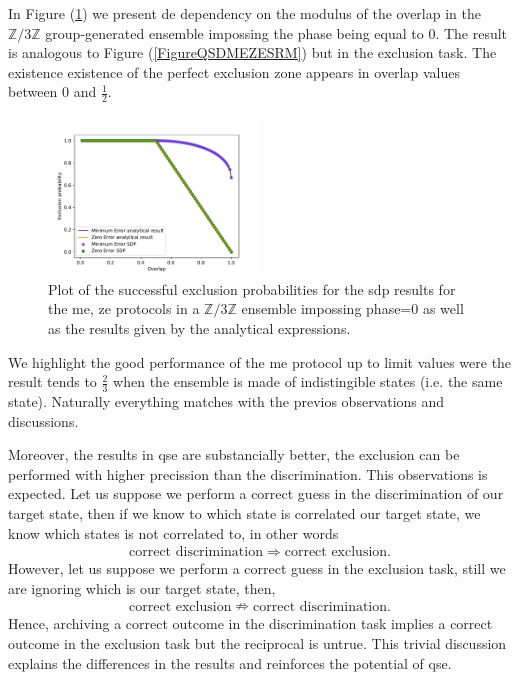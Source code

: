 \documentclass[12pt,letterpaper]{article}
\begin{document}
\begin{multicols}{2}
In Figure (\ref{FigureQSEMEZESRM}) we present de dependency on the modulus of the overlap in the $\mathbb{Z}/3\mathbb{Z}$ group-generated ensemble impossing the phase being equal to 0. The result is analogous to Figure (\ref{FigureQSDMEZESRM}) but in the exclusion task. The existence existence of the perfect exclusion zone appears in overlap values between 0 and $\frac{1}{2}$. 

\begin{figure}[H]
	\centering
	\includegraphics[width=0.5\textwidth]{../Plots/ExclusionOverlapVSSucessProbabilitySDPvsSRMZnOverlap3Phase0.pdf}
	\caption{Plot of the successful exclusion probabilities for the \gls{sdp} results for the \gls{me}, \gls{ze} protocols in a $\mathbb{Z}/3\mathbb{Z}$ ensemble impossing phase=$0$ as well as the results given by the analytical expressions.}
	\label{FigureQSEMEZESRM}
\end{figure}

We highlight the good performance of the \gls{me} protocol up to limit values were the result tends to $\frac{2}{3}$ when the ensemble is made of indistingible states (i.e. the same state). Naturally everything matches with the previos observations and discussions. 

Moreover, the results in \gls{qse} are substancially better, the exclusion can be performed with higher precission than the discrimination. This observations is expected. Let us suppose we perform a correct guess in the discrimination of our target state, then if we know to which state is correlated our target state, we know which states is not correlated to, in other words
\begin{align*}
	\text{correct discrimination}\Rightarrow\text{correct exclusion}.
\end{align*}
However, let us suppose we perform a correct guess in the exclusion task, still we are ignoring which is our target state, then,
\begin{align*}
	\text{correct exclusion}\nRightarrow\text{correct discrimination}.
\end{align*}
Hence, archiving a correct outcome in the discrimination task implies a correct outcome in the exclusion task but the reciprocal is untrue. This trivial discussion explains the differences in the results and reinforces the potential of \gls{qse}.



\end{multicols}
\end{document}
